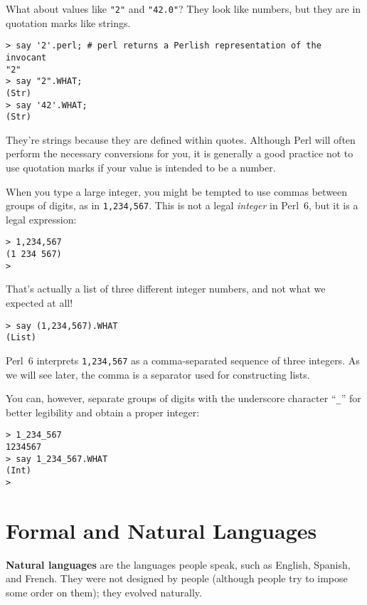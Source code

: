 What about values like \verb'"2"' and \verb'"42.0"'?
They look like numbers, but they are in quotation marks like
strings.

\begin{verbatim}
> say '2'.perl; # perl returns a Perlish representation of the invocant
"2"
> say "2".WHAT;
(Str)
> say '42'.WHAT;
(Str)
\end{verbatim}
%

They're strings because they are defined within quotes. Although 
Perl will often perform the necessary conversions for you, it 
is generally a good practice not to use quotation marks if your value 
is intended to be a number.

When you type a large integer, you might be tempted to use commas
between groups of digits, as in {\tt 1,234,567}.  This is not a
legal {\em integer} in Perl~6, but it is a legal expression:

\begin{verbatim}
> 1,234,567
(1 234 567)
>
\end{verbatim}
%
That's actually a list of three different integer numbers, and 
not what we expected at all! 

\begin{verbatim}
> say (1,234,567).WHAT
(List)
\end{verbatim}

Perl~6 interprets {\tt 1,234,567} as a comma-separated 
sequence of three integers.  As we will see later, 
the comma is a separator used for constructing lists.

You can, however, separate groups of digits with the underscore character ``\verb"_"'' for better legibility and obtain a 
proper integer:

\begin{verbatim}
> 1_234_567
1234567
> say 1_234_567.WHAT
(Int)
>
\end{verbatim}
%




\section{Formal and Natural Languages}

{\bf Natural languages} are the languages people speak,
such as English, Spanish, and French.  They were not designed
by people (although people try to impose some order on them);
they evolved naturally.

